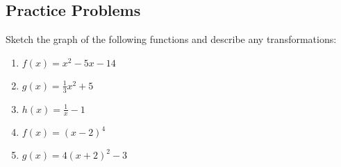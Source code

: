 \documentclass[11pt]{book}               %
\begin{document}
%
%
%
%
% 
%
% 
%  
% 
% 
%



\subsection{Practice Problems}
Sketch the graph of the following functions and describe any transformations:
\begin{enumerate}
\item $f(x)=x^2-5x-14 $ 
\item $g(x)=\frac{1}{3}x^2+5$ 
\item $ h(x)=\frac{1}{x}-1 $ 
\item $f(x)=(x-2)^4$
\item $g(x)=4(x+2)^2-3$
\end{enumerate}
\end{document}
